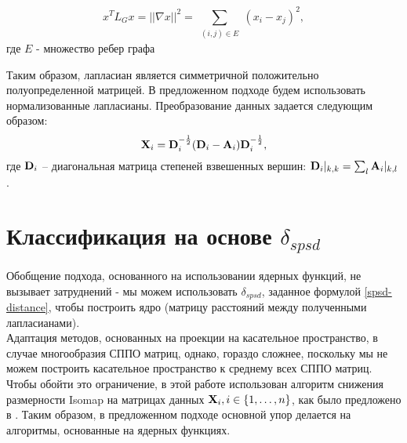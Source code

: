 \begin{corollary*}
$$ x^T L_G x = ||\nabla x||^2  = \sum_{\substack{(i,j) \in E}} (x_i-x_j)^2,$$
где $E$ - множество ребер графа
\end{corollary*}

Таким образом, лапласиан является симметричной положительно полуопределенной матрицей. В предложенном подходе будем использовать нормализованные лапласианы.
Преобразование данных задается следующим образом:
$$ {\bf X}_i = {\bf D}_i^{-\frac{1}{2}} ({\bf D}_i - {\bf A}_i) {\bf D}_i^{-\frac{1}{2}}, $$
где ${\bf D}_i$ – диагональная матрица степеней взвешенных вершин: $ {\bf D}_i \rvert_{k,k} = \sum_{\substack{l}} {\bf A}_i\rvert_{k,l}$.

\section{Классификация на основе $\delta_{spsd}$}

Обобщение подхода, основанного на использовании ядерных функций, не вызывает затруднений - мы можем использовать $\delta_{spsd}$, заданное формулой \eqref{spsd-distance}, чтобы построить ядро (матрицу расстояний между полученными лапласианами). \\
Адаптация методов, основанных на проекции на касательное пространство, в случае многообразия СППО матриц, однако, гораздо сложнее, поскольку мы не можем построить касательное пространство к среднему всех СППО матриц. Чтобы обойти это ограничение, в этой работе использован алгоритм снижения размерности Isomap \cite{tenenbaum2000global} на матрицах данных  ${\bf X}_i, i \in \left\{ 1, \ldots, n \right\}$, как было предложено в \cite{krivov2016dimensionality}.
Таким образом, в предложенном подходе основной упор делается на алгоритмы, основанные на ядерных функциях.